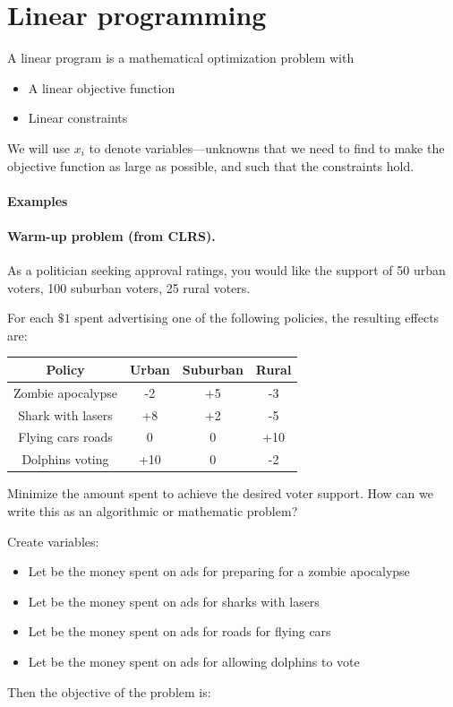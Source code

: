 \documentclass[11pt]{article}
\begin{document}
	
		\section{Linear programming}
		
		A linear program is a mathematical optimization problem with 
	\begin{itemize}
		\item A linear objective function
		\item Linear constraints
	\end{itemize}

We will use $x_i$ to denote variables---unknowns that we need to find to make the objective function as large as possible, and such that the constraints hold. \\

\paragraph{Examples} 

\newpage

		
		\paragraph{Warm-up problem (from CLRS).} 
As a politician seeking approval ratings, you would like the
support of 50 urban voters, 100 suburban voters, 25 rural
voters. 
		
For each $\$1$ spent advertising one of the following policies,
the resulting effects are:
		
\begin{center}
\begin{tabular}{|c|c|c|c|}
\hline
\textbf{Policy} & \textbf{Urban} & \textbf{Suburban} & \textbf{Rural} \\
\hline
Zombie apocalypse & -2 & +5 & -3 \\
Shark with lasers & +8 & +2 & -5 \\
Flying cars roads & 0 & 0 & +10 \\
Dolphins voting & +10 & 0 & -2 \\
\hline
\end{tabular}
\end{center}		

Minimize the amount spent to achieve the desired voter support. 
How can we write this as an algorithmic or mathematic problem?		


\vs{1cm}
Create variables:
\begin{itemize}
\item
Let  be the money spent on ads for preparing for a zombie apocalypse
\item
Let  be the money spent on ads for sharks with lasers
\item
Let  be the money spent on ads for roads for flying cars
\item
Let  be the money spent on ads for allowing dolphins to vote
\end{itemize}
Then the objective of the problem is:
\end{document}
